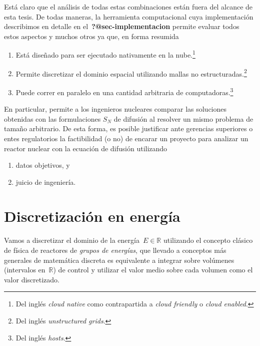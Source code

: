 \documentclass[
  12pt,
  a4paper,
  table]{scrbook}
\providecommand{\tightlist}{%
  \setlength{\itemsep}{0pt}\setlength{\parskip}{0pt}}\usepackage{longtable,booktabs,array}
\theoremstyle{plain}
\theoremstyle{definition}
\theoremstyle{plain}
\theoremstyle{plain}
\theoremstyle{remark}
\begin{document}
Está claro que el análisis de todas estas combinaciones están fuera del
alcance de esta tesis. De todas maneras, la herramienta computacional
cuya implementación describimos en detalle en
el~\textbf{?@sec-implementacion} permite evaluar todos estos aspectos y
muchos otros ya que, en forma resumida

\begin{enumerate}
\def\labelenumi{\arabic{enumi}.}
\tightlist
\item
  Está diseñado para ser ejecutado nativamente en la nube.\footnote{Del
    inglés \foreignlanguage{american}{\emph{cloud native}} como
    contrapartida a \foreignlanguage{american}{\emph{cloud friendly}} o
    \foreignlanguage{american}{\emph{cloud enabled}}.}
\item
  Permite discretizar el dominio espacial utilizando mallas no
  estructuradas.\footnote{Del inglés
    \foreignlanguage{american}{\emph{unstructured grids}}.}
\item
  Puede correr en paralelo en una cantidad arbitraria de
  computadoras.\footnote{Del inglés
    \foreignlanguage{american}{\emph{hosts}}.}
\end{enumerate}

En particular, permite a los ingenieros nucleares comparar las
soluciones obtenidas con las formulaciones \(S_N\) de difusión al
resolver un mismo problema de tamaño arbitrario. De esta forma, es
posible justificar ante gerencias superiores o entes regulatorios la
factibilidad (o no) de encarar un proyecto para analizar un reactor
nuclear con la ecuación de difusión utilizando

\begin{enumerate}
\def\labelenumi{\alph{enumi}.}
\tightlist
\item
  datos objetivos, y
\item
  juicio de ingeniería.
\end{enumerate}

\hypertarget{sec-multigrupo}{%
\section{Discretización en energía}\label{sec-multigrupo}}

Vamos a discretizar el dominio de la energía~\(E \in \mathbb{R}\)
utilizando el concepto clásico de física de reactores de \emph{grupos de
energías}, que llevado a conceptos más generales de matemática discreta
es equivalente a integrar sobre volúmenes (intervalos en~\(\mathbb{R}\))
de control y utilizar el valor medio sobre cada volumen como el valor
discretizado.
\end{document}
